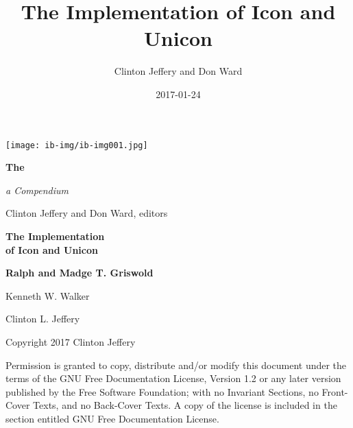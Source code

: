 \documentclass[letterpaper,twoside,12pt]{book}
\title{The Implementation of Icon and Unicon}
\author{Clinton Jeffery and Don Ward}
\date{2017-01-24}
\newcommand*{\TitleFont}{%
      \usefont{T1}{ptm}{b}{n}%
      \fontsize{50}{56}%
      \selectfont}
\begin{document}
\clearpage\clearpage\setcounter{page}{1}\pagestyle{KonvertFolgeii}
\thispagestyle{Konverti}
\begin{center}
\texttt{[image: ib-img/ib-img001.jpg]}
\end{center}
{\color{black}
\bfseries\Huge
The \vspace{0.05in}

\noindent \TitleFont
\begin{center}
\colorbox{blue}{\makebox[6.2in][r]{\parbox{6.2in}{\center\textcolor{white}{Implementation of\\ Icon and Unicon} \vspace{0.2in}}}}
\end{center}
}

\vspace{0.10in}

{\raggedleft\itshape\huge
a Compendium
\par}

\bigskip

{\raggedleft\LARGE
Clinton Jeffery and Don Ward, editors
\par}

\clearpage\setcounter{page}{1}\pagestyle{UnnumberedKonvertFolgeii}
\parbox{1in}{}

\clearpage

\bigskip
\bigskip
\bigskip

{\centering\bfseries\Huge
The Implementation\\
of Icon and Unicon
\par}

\bigskip
\bigskip
\bigskip
\bigskip
\bigskip
\bigskip
\bigskip

{\raggedleft\bfseries\Large
Ralph and Madge T. Griswold
\par
Kenneth W. Walker
\par
Clinton L. Jeffery 
\par}

\bigskip
\bigskip
\bigskip

\clearpage\setcounter{page}{1}\pagestyle{KonvertFolgeii}
\frontmatter
\bigskip
\bigskip
\noindent Copyright {\textcopyright} 2017 Clinton Jeffery


\noindent Permission is granted to copy, distribute and/or modify this
document under the terms of the GNU Free Documentation License,
Version 1.2 or any later version published by the Free Software
Foundation; with no Invariant Sections, no Front-Cover Texts, and no
Back-Cover Texts. A copy of the license is included in the section
entitled {\textquotedbl}GNU Free Documentation License{\textquotedbl}.
\end{document}
